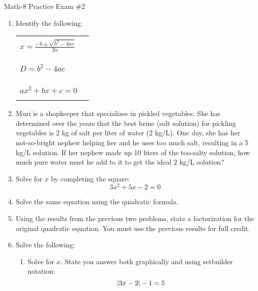 \documentclass[letterpaper,12pt,fleqn]{article}
\begin{document}
\begin{center}
\Large Math-8 Practice Exam \#2
\end{center}

\vspace{0.5in}

\newcommand{\fillin}{\rule[-10pt]{3in}{1pt}}
\newcommand{\sfillin}{\rule[-10pt]{0.5in}{1pt}}

\begin{enumerate}
\item Identify the following:

  \begin{tabular}{ll}
    \\
    $x=\frac{-b\pm\sqrt{b^2-4ac}}{2a}$ & \fillin \\
    \\
    $D=b^2-4ac$ & \fillin \\
    \\
    $ax^2+bx+c=0$ & \fillin
  \end{tabular}

  \bigskip

\item Muri is a shopkeeper that specializes in pickled vegetables. She has
  determined over the years that the best brine (salt solution) for pickling
  vegetables is 2 kg of salt per liter of water (2 kg/L).  One day, she has her
  not-so-bright nephew helping her and he uses too much salt, resulting in
  a 5 kg/L solution.  If her nephew made up 10 liters of the too-salty solution,
  how much pure water must he add to it to get the ideal 2 kg/L solution?

  \newpage

\item Solve for $x$ by completing the square:
  \[3x^2+5x-2=0\]

  \vspace{3in}

\item Solve the same equation using the quadratic formula.

  \vspace{3in}

\item Using the results from the previous two problems, state a factorization for the
  original quadratic equation. You must use the previous results for full credit.

  \newpage

\item Solve the following:
  \begin{enumerate}
  \item Solve for $x$. State you answer both graphically and using setbuilder notation:
    \[\lvert3x-2\rvert-1=5\]


\end{enumerate}
\end{enumerate}
\end{document}
